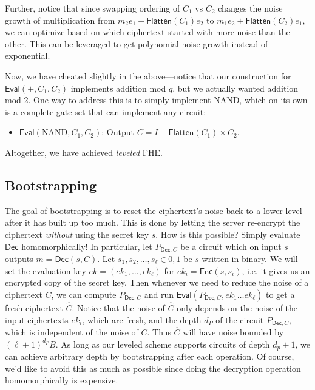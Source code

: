 \documentclass[12pt]{tufte-book}
\begin{document}
Further, notice that since swapping ordering of $C_1$ vs $C_2$ changes the noise growth of multiplication from $m_2 e_1 + \mathsf{Flatten}(C_1) e_2$ to $m_1 e_2 + \mathsf{Flatten}(C_2) e_1$, we can optimize based on which ciphertext started with more noise than the other. 
This can be leveraged to get polynomial noise growth instead of exponential. 



Now, we have cheated slightly in the above---notice that our construction for $\mathsf{Eval}(+, C_1, C_2)$ implements addition mod $q$, but we actually wanted addition mod 2. 
One way to address this is to simply implement NAND, which on its own is a complete gate set that can implement any circuit: 
\begin{itemize}
    \item $\mathsf{Eval}(\text{NAND}, C_1, C_2)$: Output $C = I - \mathsf{Flatten}(C_1) \times C_2$. 
\end{itemize}

Altogether, we have achieved \emph{leveled} FHE. 



\subsection{Bootstrapping} 

The goal of bootstrapping is to reset the ciphertext's noise back to a lower level after it has built up too much. 
This is done by letting the server re-encrypt the ciphertext \emph{without} using the secret key $s$. 
How is this possible? 
Simply evaluate $\mathsf{Dec}$ homomorphically! 
In particular, let $P_{\mathsf{Dec}, C}$ be a circuit which on input $s$ outputs $m = \mathsf{Dec}(s, C)$. 
Let $s_1, s_2, \ldots, s_{\ell} \in {0,1}$ be $s$ written in binary. 
We will set the evaluation key $ek = (ek_1, \ldots, ek_{\ell})$ for $ek_i = \mathsf{Enc}(s, s_i)$, i.e. it gives us an encrypted copy of the secret key. 
Then whenever we need to reduce the noise of a ciphertext $C$, we can compute $P_{\mathsf{Dec}, C}$ and run $\mathsf{Eval}(P_{\mathsf{Dec}, C}, ek_1 \ldots ek_\ell)$ to get a fresh ciphertext $\hat{C}$. 
Notice that the noise of $\hat{C}$ only depends on the noise of the input ciphertexts $ek_i$, which are fresh, and the depth $d_P$ of the circuit $P_{\mathsf{Dec}, C}$, which is independent of the noise of $C$. 
Thus $\hat{C}$ will have noise bounded by $(\ell + 1)^{d_P} B$. 
As long as our leveled scheme supports circuits of depth $d_p+1$, we can achieve arbitrary depth by bootstrapping after each operation. 
Of course, we'd like to avoid this as much as possible since doing the decryption operation homomorphically is expensive. 
\end{document}
